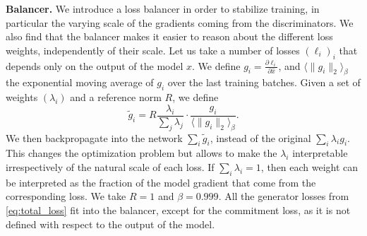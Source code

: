 {\noindent \bf Balancer.}
We introduce a loss balancer in order to stabilize training, in particular the varying scale of the gradients coming from the discriminators.
We also find that the balancer makes it easier to reason about the different loss weights, independently of their scale. 
Let us take a number of losses $(\ell_i)_i$ that depends only on the output of the model $\hat{x}$.
We define $g_i = \frac{\partial \ell_i}{\partial \hat{x}}$, and $\langle \|g_i\|_2 \rangle_\beta$ the exponential moving average 
of $g_i$ over the last training batches. Given a set of weights $(\lambda_i)$ and a reference norm $R$, we 
define 
\begin{equation}
    \tilde{g}_i = R \frac{\lambda_i}{\sum_{j} \lambda_j}\cdot \frac{g_i}{\langle \|g_i\|_2 \rangle_\beta}.
\end{equation}
We then backpropagate into the network $\sum_i \tilde{g}_i$, instead of the original $\sum_i \lambda_i g_i$.
This changes the optimization problem but allows to make the $\lambda_i$ interpretable irrespectively of the natural scale of each loss.
If $\sum_i \lambda_i = 1$, then each weight can be interpreted as the fraction of the model gradient that come from the corresponding loss.
We take $R=1$ and $\beta = 0.999$. All the generator losses from \eqref{eq:total_loss} fit into the balancer, except for the commitment loss, as it is not defined with respect to the output of the model.

 